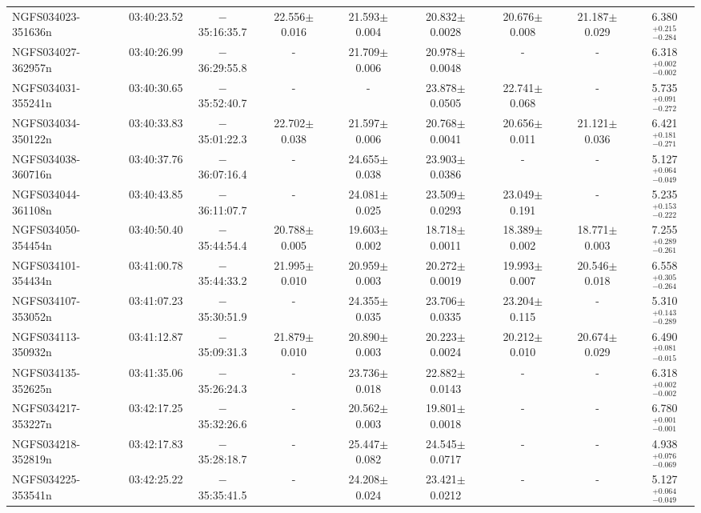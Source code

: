 \begin{tabular}{lcccccccc}
  NGFS034023-351636n & 03:40:23.52 &$-$35:16:35.7   &	22.556$\pm$0.016 & 21.593$\pm$0.004  & 20.832$\pm$0.0028 &  20.676$\pm$0.008 &  21.187$\pm$0.029   &  6.380$_{-0.284} ^{+0.215}$ \\
  NGFS034027-362957n & 03:40:26.99 &$-$36:29:55.8   &	     -           & 21.709$\pm$0.006  & 20.978$\pm$0.0048 &          -	     &          -	   &  6.318$_{-0.002} ^{+0.002}$ \\
  NGFS034031-355241n & 03:40:30.65 &$-$35:52:40.7   &	     -           &        -          & 23.878$\pm$0.0505 &  22.741$\pm$0.068 &          -	   &  5.735$_{-0.272} ^{+0.091}$ \\
  NGFS034034-350122n & 03:40:33.83 &$-$35:01:22.3   &	22.702$\pm$0.038 & 21.597$\pm$0.006  & 20.768$\pm$0.0041 &  20.656$\pm$0.011 &  21.121$\pm$0.036   &  6.421$_{-0.271} ^{+0.181}$ \\
  NGFS034038-360716n & 03:40:37.76 &$-$36:07:16.4   &	     -           & 24.655$\pm$0.038  & 23.903$\pm$0.0386 &          -	     &          -	   &  5.127$_{-0.049} ^{+0.064}$ \\
  NGFS034044-361108n & 03:40:43.85 &$-$36:11:07.7   &	     -           & 24.081$\pm$0.025  & 23.509$\pm$0.0293 &  23.049$\pm$0.191 &          -	   &  5.235$_{-0.222} ^{+0.153}$ \\
  NGFS034050-354454n & 03:40:50.40 &$-$35:44:54.4   &	20.788$\pm$0.005 & 19.603$\pm$0.002  & 18.718$\pm$0.0011 &  18.389$\pm$0.002 &  18.771$\pm$0.003   &  7.255$_{-0.261} ^{+0.289}$ \\
  NGFS034101-354434n & 03:41:00.78 &$-$35:44:33.2   &	21.995$\pm$0.010 & 20.959$\pm$0.003  & 20.272$\pm$0.0019 &  19.993$\pm$0.007 &  20.546$\pm$0.018   &  6.558$_{-0.264} ^{+0.305}$ \\
  NGFS034107-353052n & 03:41:07.23 &$-$35:30:51.9   &	     -           & 24.355$\pm$0.035  & 23.706$\pm$0.0335 &  23.204$\pm$0.115 &          -	   &  5.310$_{-0.289} ^{+0.143}$ \\
  NGFS034113-350932n & 03:41:12.87 &$-$35:09:31.3   &	21.879$\pm$0.010 & 20.890$\pm$0.003  & 20.223$\pm$0.0024 &  20.212$\pm$0.010 &  20.674$\pm$0.029   &  6.490$_{-0.015} ^{+0.081}$ \\
  NGFS034135-352625n & 03:41:35.06 &$-$35:26:24.3   &	     -           & 23.736$\pm$0.018  & 22.882$\pm$0.0143 &          -	     &          -	   &  6.318$_{-0.002} ^{+0.002}$ \\
  NGFS034217-353227n & 03:42:17.25 &$-$35:32:26.6   &	     -           & 20.562$\pm$0.003  & 19.801$\pm$0.0018 &          -	     &          -	   &  6.780$_{-0.001} ^{+0.001}$ \\
  NGFS034218-352819n & 03:42:17.83 &$-$35:28:18.7   &	     -           & 25.447$\pm$0.082  & 24.545$\pm$0.0717 &          -	     &          -	   &  4.938$_{-0.069} ^{+0.076}$ \\
  NGFS034225-353541n & 03:42:25.22 &$-$35:35:41.5   &	     -           & 24.208$\pm$0.024  & 23.421$\pm$0.0212 &          -	     &          -	   &  5.127$_{-0.049} ^{+0.064}$ \\
\end{tabular}
